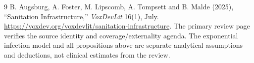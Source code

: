 \documentclass[11pt,a4paper]{article}
\theoremstyle{definition}
\theoremstyle{remark}
\begin{document}
\begin{thebibliography}{9}
 B. Augsburg, A. Foster, M. Lipscomb, A. Tompsett and B. Malde (2025), ``Sanitation Infrastructure,'' \emph{VoxDevLit} 16(1), July. \url{https://voxdev.org/voxdevlit/sanitation-infrastructure}. The primary review page verifies the source identity and coverage/externality agenda. The exponential infection model and all propositions above are separate analytical assumptions and deductions, not clinical estimates from the review.
\end{thebibliography}
\end{document}
